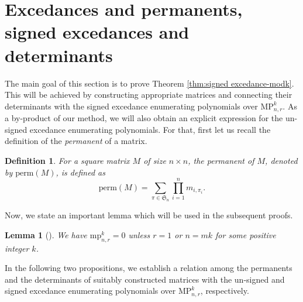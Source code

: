 \documentclass[12pt]{article}
\newcommand{\Perm}{\mathrm{perm}}
\newcommand{\MP}{\mathrm{MP}}
\newcommand{\mpa}{\mathrm{mp}}
\newcommand{\SSS}{\mathfrak{S}}
\newtheorem{lemma}{\bf Lemma}[section]
\newtheorem{definition}{\bf Definition}[section]
\begin{document}




\section{Excedances and permanents, signed excedances and determinants}

The main goal of this section is to prove Theorem \ref{thm:signed excedance-modk}. This will be achieved by constructing appropriate matrices and connecting their determinants with the signed excedance enumerating polynomials over $\MP_{n,r}^k$. As a by-product of our method, we will also obtain  an explicit expression for the un-signed excedance enumerating polynomials. For that, first let us recall the definition of the {\it permanent} of a matrix.

\begin{definition}
For a square matrix $M$ of size $n \times n$, the permanent of $M$,  denoted by $\Perm(M)$, is defined as 
\[ \Perm(M)  =  \displaystyle  \sum _{\pi \in \SSS_n}  \prod _{i=1}^n m_{i,\pi_i}. \]    
\end{definition}

Now, we state an important lemma which will be used in the subsequent proofs. 

\begin{lemma}[{\cite[Lemma 9]{alexandersson-rebede}}]
\label{lem:cruicial} 
We have $\mpa_{n,r}^k=0$ unless $r=1$ or $n=mk$ for some positive integer $k$.
\end{lemma}

In the following two propositions, we establish a relation among 
the permanents and the determinants of suitably constructed matrices with the un-signed and signed excedance enumerating polynomials over $\MP_{n,r}^k$, respectively. 
\end{document}
